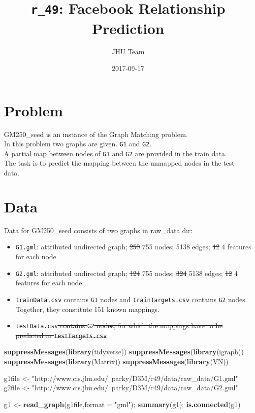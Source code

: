\documentclass[]{article}
\title{\texttt{r\_49}: Facebook Relationship Prediction}
\author{JHU Team}
\date{2017-09-17}
\newenvironment{Shaded}{\begin{snugshade}}{\end{snugshade}}
\newcommand{\KeywordTok}[1]{\textcolor[rgb]{0.13,0.29,0.53}{\textbf{#1}}}
\newcommand{\DataTypeTok}[1]{\textcolor[rgb]{0.13,0.29,0.53}{#1}}
\newcommand{\StringTok}[1]{\textcolor[rgb]{0.31,0.60,0.02}{#1}}
\newcommand{\NormalTok}[1]{#1}
\providecommand{\tightlist}{%
  \setlength{\itemsep}{0pt}\setlength{\parskip}{0pt}}
\begin{document}
\maketitle

{
\setcounter{tocdepth}{2}
\tableofcontents
}
\section{Problem}\label{problem}

GM250\_seed is an instance of the Graph Matching problem.\\
In this problem two graphs are given. \texttt{G1} and \texttt{G2}.\\
A partial map between nodes of \texttt{G1} and \texttt{G2} are provided
in the train data.\\
The task is to predict the mapping between the unmapped nodes in the
test data.

\section{Data}\label{data}

Data for GM250\_seed consists of two graphs in raw\_data dir:

\begin{itemize}
\tightlist
\item
  \texttt{G1.gml}: attributed undirected graph; \sout{250} 755 nodes;
  5138 edges; \sout{12} 4 features for each node
\item
  \texttt{G2.gml}: attributed undirected graph; \sout{124} 755 nodes;
  \sout{324} 5138 edges; \sout{12} 4 features for each node
\item
  \texttt{trainData.csv} contains \texttt{G1} nodes and
  \texttt{trainTargets.csv} contains \texttt{G2} nodes. Together, they
  constitute 151 known mappings.
\item
  \sout{\texttt{testData.csv} contains \texttt{G2} nodes, for which the
  mappings have to be predicted in \texttt{testTargets.csv}}
\end{itemize}

\begin{Shaded}
\begin{Highlighting}[]
\KeywordTok{suppressMessages}\NormalTok{(}\KeywordTok{library}\NormalTok{(tidyverse))}
\KeywordTok{suppressMessages}\NormalTok{(}\KeywordTok{library}\NormalTok{(igraph))}
\KeywordTok{suppressMessages}\NormalTok{(}\KeywordTok{library}\NormalTok{(Matrix))}
\KeywordTok{suppressMessages}\NormalTok{(}\KeywordTok{library}\NormalTok{(VN))}

\NormalTok{g1file <-}\StringTok{ "http://www.cis.jhu.edu/~parky/D3M/r49/data/raw_data/G1.gml"}
\NormalTok{g2file <-}\StringTok{ "http://www.cis.jhu.edu/~parky/D3M/r49/data/raw_data/G2.gml"}

\NormalTok{g1 <-}\StringTok{ }\KeywordTok{read_graph}\NormalTok{(g1file,}\DataTypeTok{format =} \StringTok{"gml"}\NormalTok{); }\KeywordTok{summary}\NormalTok{(g1); }\KeywordTok{is.connected}\NormalTok{(g1)}
\end{Highlighting}
\end{Shaded}
\end{document}

